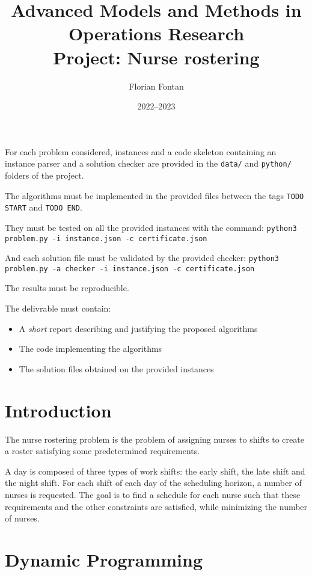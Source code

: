 \documentclass[a4paper,twocolumn]{article}
\author{Florian Fontan}
\title{Advanced Models and Methods in Operations Research \\ Project: Nurse rostering}
\date{2022--2023}
\begin{document}
\maketitle

For each problem considered, instances and a code skeleton containing an instance parser and a solution checker are provided in the \texttt{data/} and \texttt{python/} folders of the project.

The algorithms must be implemented in the provided files between the tags \texttt{TODO START} and \texttt{TODO END}.

They must be tested on all the provided instances with the command:
\texttt{python3 problem.py -i instance.json -c certificate.json}

And each solution file must be validated by the provided checker:
\texttt{python3 problem.py -a checker -i instance.json -c certificate.json}

The results must be reproducible.

\bigskip

The delivrable must contain:
\begin{itemize}
  \item A \emph{short} report describing and justifying the proposed algorithms
  \item The code implementing the algorithms
  \item The solution files obtained on the provided instances
\end{itemize}

\section*{Introduction}

The nurse rostering problem is the problem of assigning nurses to shifts to create a roster satisfying some predetermined requirements.

A day is composed of three types of work shifts: the early shift, the late shift and the night shift. For each shift of each day of the scheduling horizon, a number of nurses is requested. The goal is to find a schedule for each nurse such that these requirements and the other constraints are satisfied, while minimizing the number of nurses.

\section{Dynamic Programming}
\end{document}
